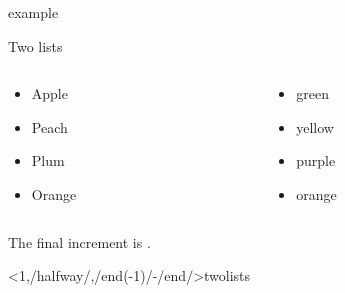 \documentclass[\jobname]{beamer} %
\begin{document}
\begin{frame}[label=twolists]{example \theexampc}
  \resetincr
  \begin{center}
    Two lists \\
  \end{center}
  \begin{columns}
    \begin{column}{.2\textwidth}
      \begin{itemize}[<+-| alert@+>]
      \item Apple \item Peach  \item Plum \item Orange
      \end{itemize}
    \end{column}
    \begin{column}{.2\textwidth}
      \resetincr[/startlist/]%
      \begin{itemize}[<+-| alert@+>]
      \item green \item yellow \item purple \item orange
      \end{itemize}
    \end{column}
  \end{columns}
  \vfill
  \onslide<+->
  The final increment is . 
\end{frame}

\againframe<1,/halfway/,/end(-1)/-/end/>{twolists}
\end{document}
